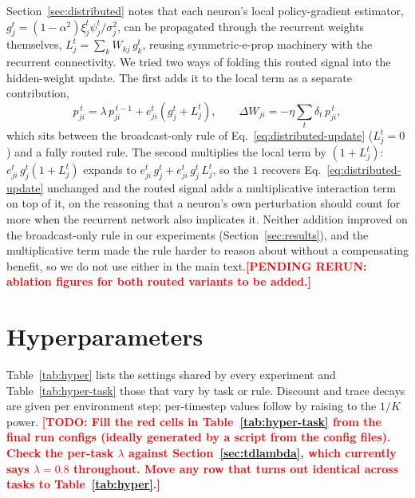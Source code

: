 \documentclass[10pt,twocolumn]{article}
\newcommand{\pending}[1]{\textcolor{red}{\bfseries[PENDING RERUN#1]}}
\newcommand{\todo}[1]{\textcolor{red}{\bfseries[TODO: #1]}}
\begin{document}
Section~\ref{sec:distributed} notes that each neuron's local policy-gradient
estimator, $g^t_j=(1-\alpha^2)\xi^t_j\psi^t_j/\sigma_j^2$, can be propagated
through the recurrent weights themselves, $L^t_j=\sum_k W_{kj}\,g^t_k$,
reusing symmetric-e-prop machinery with the recurrent connectivity. We tried
two ways of folding this routed signal into the hidden-weight update. The
first adds it to the local term as a separate contribution,
\begin{equation}
p^{\,t}_{ji} = \lambda\, p^{\,t-1}_{ji} + e^t_{ji}\left(g^t_j + L^t_j\right),
\qquad \Delta W_{ji} = -\eta\sum_t \delta_t\, p^{\,t}_{ji},
\label{eq:routed-update}
\end{equation}
which sits between the broadcast-only rule of
Eq.~\eqref{eq:distributed-update} ($L^t_j=0$) and a fully routed rule. The
second multiplies the local term by $(1+L^t_j)$: $e^t_{ji}\,g^t_j(1+L^t_j)$
expands to $e^t_{ji}\,g^t_j + e^t_{ji}\,g^t_j\,L^t_j$, so the $1$ recovers
Eq.~\eqref{eq:distributed-update} unchanged and the routed signal adds a
multiplicative interaction term on top of it, on the reasoning that a
neuron's own perturbation should count for more when the recurrent network
also implicates it. Neither addition
improved on the broadcast-only rule in our experiments
(Section~\ref{sec:results}), and the multiplicative term made the rule
harder to reason about without a compensating benefit, so we do not use
either in the main text.\pending{: ablation figures for both routed variants
to be added.}

\section{Hyperparameters}
\label{app:hyper}
Table~\ref{tab:hyper} lists the settings shared by every experiment and
Table~\ref{tab:hyper-task} those that vary by task or rule. Discount and trace
decays are given per environment step; per-timestep values follow by raising to
the $1/K$ power.
\todo{Fill the red cells in Table~\ref{tab:hyper-task} from the final run
configs (ideally generated by a script from the config files). Check the
per-task $\lambda$ against Section~\ref{sec:tdlambda}, which currently says
$\lambda=0.8$ throughout. Move any row that turns out identical across tasks to
Table~\ref{tab:hyper}.}
\end{document}
